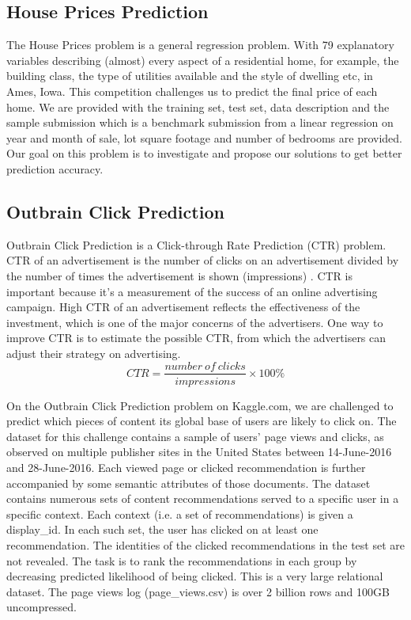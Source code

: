 \documentclass[fleqn,10pt]{SelfArx} %
\begin{document}
\subsection{House Prices Prediction}
The House Prices problem is a general regression problem. With 79 explanatory variables describing (almost) every aspect of a residential home, for example, the building class, the type of utilities available and the style of dwelling etc,  in Ames, Iowa. This competition challenges us to predict the final price of each home. We are provided with the training set, test set,  data description and the sample submission which is a benchmark submission from a linear regression on year and month of sale, lot square footage and number of bedrooms are provided. Our goal on this problem is to investigate and propose our solutions to get better prediction accuracy.

\subsection{Outbrain Click Prediction}
Outbrain Click Prediction is a Click-through Rate Prediction (CTR) problem. CTR of an advertisement is the number of clicks on an advertisement divided by the number of times the advertisement is shown (impressions) \cite{wiki:CTR}. CTR is important because it's a measurement of the success of an online advertising campaign. High CTR of an advertisement reflects the effectiveness of the investment, which is one of the major concerns of the advertisers. One way to improve CTR is to estimate the possible CTR, from which the advertisers can adjust their strategy on advertising.
\begin{equation}
CTR = \frac{number\ of\ clicks}{impressions} \times 100\%
\end{equation}

On the Outbrain Click Prediction problem on Kaggle.com, we are challenged to predict which pieces of content its global base of users are likely to click on. The dataset for this challenge contains a sample of users' page views and clicks, as observed on multiple publisher sites in the United States between 14-June-2016 and 28-June-2016. Each viewed page or clicked recommendation is further accompanied by some semantic attributes of those documents. The dataset contains numerous sets of content recommendations served to a specific user in a specific context. Each context (i.e. a set of recommendations) is given a display\_id. In each such set, the user has clicked on at least one recommendation. The identities of the clicked recommendations in the test set are not revealed. The task is to rank the recommendations in each group by decreasing predicted likelihood of being clicked. This is a very large relational dataset. The page views log (page\_views.csv) is over 2 billion rows and 100GB uncompressed. 
\end{document}
